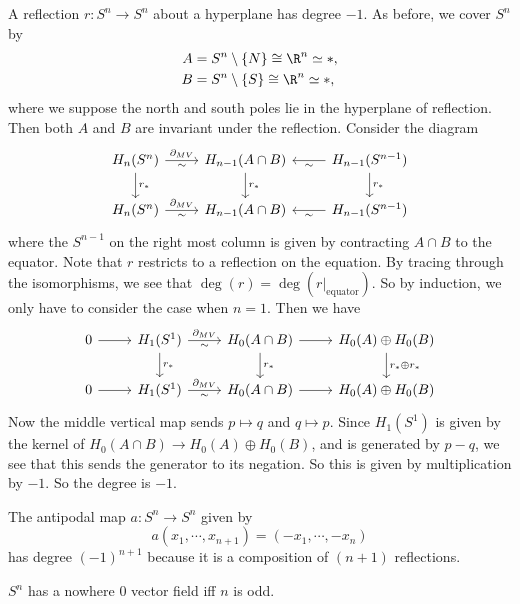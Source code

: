 \documentclass[a4paper]{article}
\begin{document}
\begin{prop}
  A reflection $r: S^n \to S^n$ about a hyperplane has degree $-1$. As before, we cover $S^n$ by
  \begin{align*}
    A &= S^n \setminus \{N\} \cong \R^n \simeq *,\\
    B &= S^n \setminus \{S\} \cong \R^n \simeq *,
  \end{align*}
  where we suppose the north and south poles lie in the hyperplane of reflection. Then both $A$ and $B$ are invariant under the reflection. Consider the diagram
  \[
    \begin{tikzcd}
      H_n(S^n) \ar[r, "\partial_{MV}", "\sim"'] \ar[d, "r_*"] & H_{n - 1}(A \cap B) \ar[d, "r_*"] & H_{n - 1}(S^{n - 1}) \ar[l, "\sim"] \ar[d, "r_*"]\\
      H_n(S^n) \ar[r, "\partial_{MV}", "\sim"'] & H_{n - 1}(A \cap B) & H_{n - 1}(S^{n - 1}) \ar[l, "\sim"]
    \end{tikzcd}
  \]
  where the $S^{n - 1}$ on the right most column is given by contracting $A \cap B$ to the equator. Note that $r$ restricts to a reflection on the equation. By tracing through the isomorphisms, we see that $\deg(r) = \deg(r|_{\mathrm{equator}})$. So by induction, we only have to consider the case when $n = 1$. Then we have
  \[
    \begin{tikzcd}
      0 \ar[r] & H_1(S^1) \ar[r, "\partial_{MV}", "\sim"'] \ar[d, "r_*"] & H_0(A \cap B) \ar[d, "r_*"] \ar[r] & H_0(A) \oplus H_0(B) \ar[d, "r_* \oplus r_*"]\\
      0 \ar[r] & H_1(S^1) \ar[r, "\partial_{MV}", "\sim"'] & H_0(A \cap B) \ar[r] & H_0(A) \oplus H_0(B)
    \end{tikzcd}
  \]
  Now the middle vertical map sends $p \mapsto q$ and $q \mapsto p$. Since $H_1(S^1)$ is given by the kernel of $H_0(A \cap B) \to H_0(A) \oplus H_0(B)$, and is generated by $p - q$, we see that this sends the generator to its negation. So this is given by multiplication by $-1$. So the degree is $-1$.
\end{prop}

\begin{cor}
  The antipodal map $a: S^n \to S^n$ given by
  \[
    a(x_1, \cdots, x_{n + 1}) = (-x_1, \cdots, -x_n)
  \]
  has degree $(-1)^{n + 1}$ because it is a composition of $(n + 1)$ reflections.
\end{cor}

\begin{cor}
  $S^n$ has a nowhere $0$ vector field iff $n$ is odd.
\end{cor}
\end{document}
